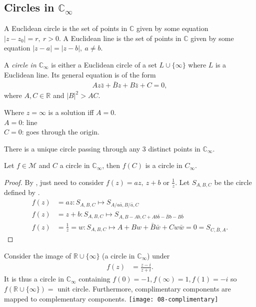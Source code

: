 \subsection{Circles in $\mathbb{C}_\infty$}

A Euclidean circle is the set of points in $\mathbb{C}$ given by some equation $|z - z_0| = r,\ r > 0$.
A Euclidean line is the set of points in $\mathbb{C}$ given by some equation $|z - a| = |z - b|,\ a \neq b$.

\begin{definition}
    A \emph{circle in $\mathbb{C}_\infty$} is either a Euclidean circle of a set $L \cup \{\infty\}$ where $L$ is a Euclidean line.
    Its general equation is of the form 
    \begin{align}
        Az\bar z + \bar Bz + B\bar z + C = 0, \label{eq:circle}
    \end{align} 
    where $A, C \in \mathbb{R}$ and $|B|^2 > AC$.
\end{definition}

Where $z = \infty$ is a solution iff $A = 0$. \\
$A = 0$: line \\
$C = 0$: goes through the origin.

There is a unique circle passing through any 3 distinct points in $\mathbb{C}_\infty$.

\begin{theorem} \label{thm:18}
    Let $f \in \mathcal{M}$ and $C$ a circle in $\mathbb{C}_\infty$, then $f(C)$ is a circle in $C_\infty$.
\end{theorem} 

\begin{proof}
    By , just need to consider 
    $f(z) = az,\ z + b \text{ or } \frac{1}{z}.$
    Let $S_{A, B, C}$ be the circle defined by .
    \begin{align*}
        f(z) &= az : S_{A, B, C} \mapsto S_{A / a \bar{a}, B / \bar{a}, C} \\
        f(z) &= z + b: S_{A, B, C} \mapsto S_{A, B - Ab, C + A b \bar{b} - \bar{B}b - B \bar{b}} \\
        f(z) &= \frac{1}{z} = w: S_{A, B, C} \mapsto A + B w + \bar{B} \bar{w} + C w \bar{w} = 0 = S_{C, \bar{B}, A}.
    \end{align*} 
\end{proof} 

\begin{example}
    Consider the image of $\mathbb{R} \cup \{\infty\}$ (a circle in $\mathbb{C}_\infty$) under 
    \begin{align*}
        f(z) &= \frac{z - i}{z + i}.
    \end{align*} 
    It is thus a circle in $\mathbb{C}_\infty$ containing $f(0) = -1, f(\infty) = 1, f(1) = -i$ so $f(\mathbb{R} \cup \{\infty\}) = $ unit circle. 
    Furthermore, complimentary components are mapped to complementary components.
    {\centering \texttt{[image: 08-complimentary]}}
\end{example} 

